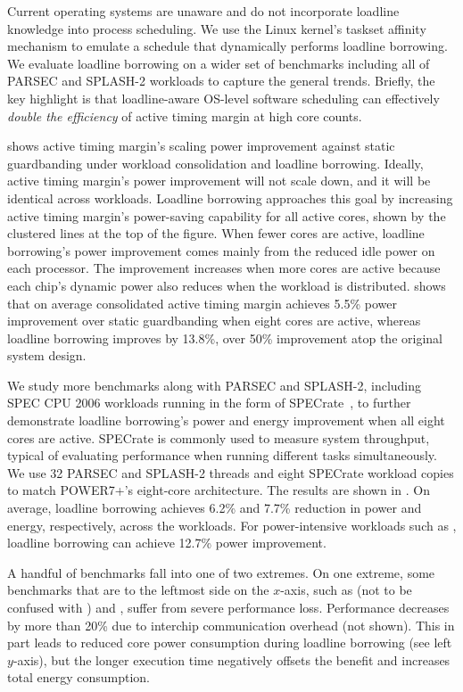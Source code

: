 Current operating systems are unaware and do not incorporate loadline knowledge into process scheduling. We use the Linux kernel's taskset affinity mechanism to emulate a schedule that dynamically performs loadline borrowing. We evaluate loadline borrowing on a wider set of benchmarks including all of PARSEC and SPLASH-2 workloads to capture the general trends. Briefly, the key highlight is that loadline-aware OS-level software scheduling can effectively \emph{double the efficiency} of active timing margin at high core counts.

 shows active timing margin's scaling power improvement against static guardbanding under workload consolidation and loadline borrowing. Ideally, active timing margin's power improvement will not scale down, and it will be identical across workloads. Loadline borrowing approaches this goal by increasing active timing margin's power-saving capability for all active cores, shown by the clustered lines at the top of the figure. When fewer cores are active, loadline borrowing's power improvement comes mainly from the reduced idle power on each processor. The improvement increases when more cores are active because each chip's dynamic power also reduces when the workload is distributed.  shows that on average consolidated active timing margin achieves 5.5\% power improvement over static guardbanding when eight cores are active, whereas loadline borrowing improves by 13.8\%, over 50\% improvement atop the original system design.

We study more benchmarks along with PARSEC and SPLASH-2, including SPEC CPU 2006 workloads running in the form of SPECrate~\cite{SPECrate}, to further demonstrate loadline borrowing's power and energy improvement when all eight cores are active. SPECrate is commonly used to measure system throughput, typical of evaluating performance when running different tasks simultaneously. We use 32 PARSEC and SPLASH-2 threads and eight SPECrate workload copies to match POWER7+'s eight-core architecture. The results are shown in . On average, loadline borrowing achieves 6.2\% and 7.7\% reduction in power and energy, respectively, across the workloads. For power-intensive workloads such as , loadline borrowing can achieve 12.7\% power improvement. 

A handful of benchmarks fall into one of two extremes. On one extreme, some benchmarks that are to the leftmost side on the $x$-axis, such as  (not to be confused with ) and , suffer from severe performance loss. Performance decreases by more than 20\% due to interchip communication overhead (not shown). This in part leads to reduced core power consumption during loadline borrowing (see left $y$-axis), but the longer execution time negatively offsets the benefit and increases total energy consumption. 

